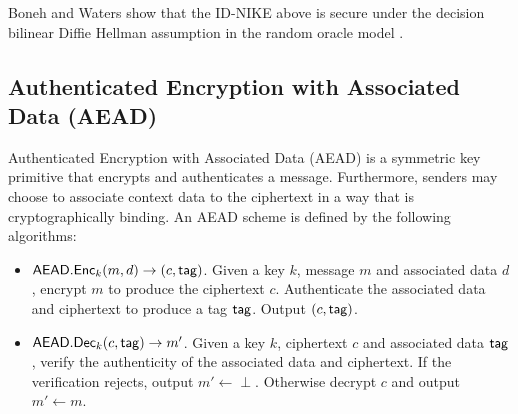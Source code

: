 	Boneh and Waters show that the ID-NIKE above is secure under the decision bilinear Diffie Hellman assumption in the random oracle model \cite{boneh2013constrained}.
	
\subsection{Authenticated Encryption with Associated Data (AEAD)}

	Authenticated Encryption with Associated Data (AEAD) is a symmetric key primitive that encrypts and authenticates a message.
	Furthermore, senders may choose to associate context data to the ciphertext in a way that is cryptographically binding.
	An AEAD scheme is defined by the following algorithms:
	
	\begin{itemize}
		\item $\mathsf{AEAD}.\mathsf{Enc}_k(m, d) \rightarrow (c, \mathsf{tag})$. 
			Given a key $k$, message $m$ and associated data $d$, encrypt $m$ to produce the ciphertext $c$.
			Authenticate the associated data and ciphertext to produce a tag $\mathsf{tag}$. 
			Output $(c, \mathsf{tag})$.
		\item $\mathsf{AEAD}.\mathsf{Dec}_k(c, \mathsf{tag}) \rightarrow m'$. 
			Given a key $k$, ciphertext $c$ and associated data $\mathsf{tag}$, verify the authenticity of the associated data and ciphertext. 
			If the verification rejects, output $m' \leftarrow \perp$. 
			Otherwise decrypt $c$ and output $m' \leftarrow m$.
	\end{itemize}



